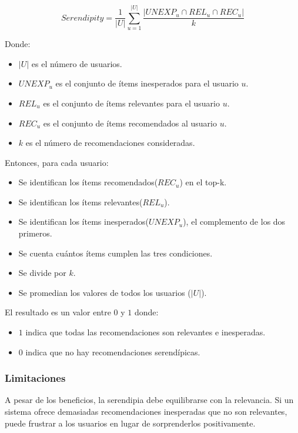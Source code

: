 \documentclass[11pt,a4paper,twoside]{thesis}
\begin{document}
\begin{equation}
	Serendipity = \frac{1}{|U|} \sum_{u=1}^{|U|} \frac{|UNEXP_u \cap REL_u \cap REC_u|}{k}
\end{equation}

Donde:
\begin{itemize}
	\item $|U|$ es el número de usuarios.
	\item $UNEXP_u$ es el conjunto de ítems inesperados para el usuario $u$.
	\item $REL_u$ es el conjunto de ítems relevantes para el usuario $u$.
	\item $REC_u$ es el conjunto de ítems recomendados al usuario $u$.
	\item $k$ es el número de recomendaciones consideradas.
\end{itemize}


Entonces, para cada usuario:

\begin{itemize}
	\item Se identifican los ítems recomendados($REC_u$) en el top-k.
	\item Se identifican los ítems relevantes($REL_u$).
	\item Se identifican los ítems inesperados($UNEXP_u$), el complemento de los dos primeros.
	\item Se cuenta cuántos ítems cumplen las tres condiciones.
	\item Se divide por $k$.
	\item Se promedian los valores de todos los usuarios ($|U|$).
\end{itemize}

El resultado es un valor entre $0$ y $1$ donde:
\begin{itemize}
	\item $1$ indica que todas las recomendaciones son relevantes e inesperadas.
	\item $0$ indica que no hay recomendaciones serendípicas.
\end{itemize}



\subsubsection*{Limitaciones}

A pesar de los beneficios, la serendipia debe equilibrarse con la relevancia. Si un sistema ofrece demasiadas recomendaciones inesperadas que no son relevantes, puede frustrar a los usuarios en lugar de sorprenderlos positivamente.
\end{document}
